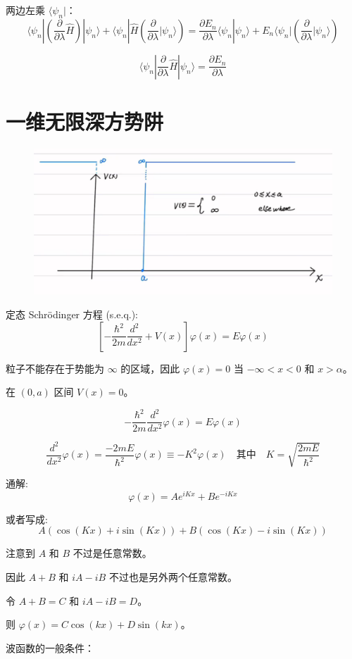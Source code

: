 \documentclass[lang=cn,15pt]{elegantbook}
\begin{document}
两边左乘 \(\langle \psi_n|\)：
\[
\langle \psi_n| \left( \frac{\partial}{\partial \lambda} \hat{H} \right) |\psi_n\rangle + \langle \psi_n| \hat{H} \left( \frac{\partial}{\partial \lambda} |\psi_n\rangle \right) = \frac{\partial E_n}{\partial \lambda} \langle \psi_n|\psi_n\rangle + E_n \langle \psi_n| \left( \frac{\partial}{\partial \lambda} |\psi_n\rangle \right)
\]

\[
\langle \psi_n| \frac{\partial}{\partial \lambda} \hat{H} |\psi_n\rangle = \frac{\partial E_n}{\partial \lambda}
\]
\section{一维无限深方势阱}
\begin{figure}[H]
	\centering
	\includegraphics[width=0.7\linewidth]{figure/screenshot0020}
\end{figure}

定态 Schrödinger 方程 (s.e.q.):
\[
\left[-\frac{\hbar^2}{2m}\frac{d^2}{dx^2} + V(x)\right]\varphi(x) = E\varphi(x)
\]

粒子不能存在于势能为 $\infty$ 的区域，因此 $\varphi(x) = 0$ 当 $-\infty < x < 0$ 和 $x > \alpha$。

在 $(0, a)$ 区间 $V(x) = 0$。

\[
-\frac{\hbar^2}{2m}\frac{d^2}{dx^2}\varphi(x) = E\varphi(x)
\]

\[
\frac{d^2}{dx^2}\varphi(x) = \frac{-2mE}{\hbar^2}\varphi(x) \equiv -K^2\varphi(x) \quad \text{其中} \quad K = \sqrt{\frac{2mE}{\hbar^2}}
\]

通解:
\[
\varphi(x) = A e^{i K x} + B e^{-i K x}
\]

或者写成:
\[
A(\cos(Kx) + i \sin(Kx)) + B(\cos(Kx) - i \sin(Kx))
\]

注意到 $A$ 和 $B$ 不过是任意常数。

因此 $A+B$ 和 $iA-iB$ 不过也是另外两个任意常数。

令 $A+B = C$ 和 $iA-iB = D$。

则 $\varphi(x) = C \cos(kx) + D \sin(kx)$。

波函数的一般条件：
\end{document}
